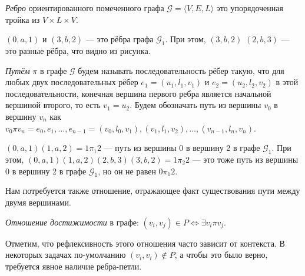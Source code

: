 \begin{definition}
  \textit{Ребро} ориентированного помеченного графа $\mathcal{G} = \langle V, E, L \rangle$ это упорядоченная тройка из $V \times L \times V$.
\end{definition}

\begin{example}
$(0,a,1)$  и $(3,b,2)$ --- это рёбра графа $\mathcal{G}_1$. При этом, $(3,b,2)$ $(2,b,3)$ --- это разные рёбра, что видно из рисунка.
\end{example}

\begin{definition}
  \textit{Путём} $\pi$ в графе $\mathcal{G}$ будем называть последовательность рёбер такую, что для любых двух последовательных рёбер $e_1=(u_1,l_1,v_1)$ и $e_2=(u_2,l_2,v_2)$ в этой последовательности, конечная вершина первого ребра является начальной вершиной второго, то есть $v_1 = u_2$. Будем обозначать путь из вершины $v_0$ в вершину $v_n$ как $v_0 \pi v_n = e_0,e_1, \dots, e_{n-1} = (v_0, l_0, v_1),(v_1,l_1,v_2),\dots,(v_{n-1},l_n,v_n)$.
  
\begin{center}
  \end{center}
\end{definition}

\begin{example}
$(0,a,1)(1,a,2) = 1\pi_1 2$  --- путь из вершины 0 в вершину 2 в графе $\mathcal{G}_1$.
При этом, $(0,a,1)(1,a,2)(2,b,3)(3,b,2) = 1\pi_2 2$ --- это тоже путь из вершины 0 в вершину 2 в графе $\mathcal{G}_1$, но он не равен $0\pi_1 2$.
\end{example}

Нам потребуется также отношение, отражающее факт существования пути между двумя вершинами.

\begin{definition}\label{def:reach}
  \textit{Отношение достижимости} в графе:
  $(v_i,v_j) \in P \iff \exists v_i \pi v_j$.
\end{definition}

Отметим, что рефлексивность этого отношения часто зависит от контекста.
В некоторых задачах по-умолчанию $(v_i,v_i) \notin P$, а чтобы это было верно, требуется явное наличие ребра-петли.

